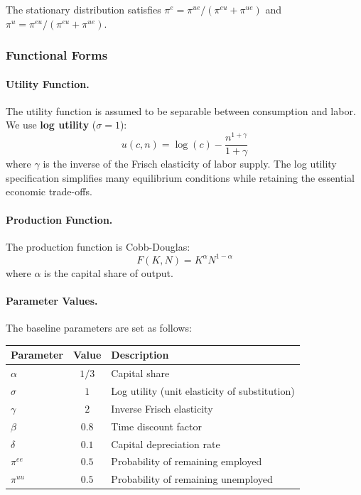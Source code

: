 The stationary distribution satisfies $\pi^e = \pi^{ue} / (\pi^{eu} + \pi^{ue})$ and $\pi^u = \pi^{eu} / (\pi^{eu} + \pi^{ue})$.

\subsubsection{Functional Forms}
\paragraph{Utility Function.}
The utility function is assumed to be separable between consumption and labor. We use \textbf{log utility} ($\sigma = 1$):
\begin{equation}
    u(c, n) = \log(c) - \frac{n^{1+\gamma}}{1+\gamma}
\end{equation}
where $\gamma$ is the inverse of the Frisch elasticity of labor supply. The log utility specification simplifies many equilibrium conditions while retaining the essential economic trade-offs.

\paragraph{Production Function.}
The production function is Cobb-Douglas:
\begin{equation}
    F(K, N) = K^{\alpha} N^{1-\alpha}
\end{equation}
where $\alpha$ is the capital share of output.

\paragraph{Parameter Values.}
The baseline parameters are set as follows:
\begin{center}
\begin{tabular}{lcl}
\hline
\textbf{Parameter} & \textbf{Value} & \textbf{Description} \\
\hline
$\alpha$ & $1/3$ & Capital share \\
$\sigma$ & $1$ & Log utility (unit elasticity of substitution) \\
$\gamma$ & $2$ & Inverse Frisch elasticity \\
$\beta$ & $0.8$ & Time discount factor \\
$\delta$ & $0.1$ & Capital depreciation rate \\
$\pi^{ee}$ & $0.5$ & Probability of remaining employed \\
$\pi^{uu}$ & $0.5$ & Probability of remaining unemployed \\
\hline
\end{tabular}
\end{center}

